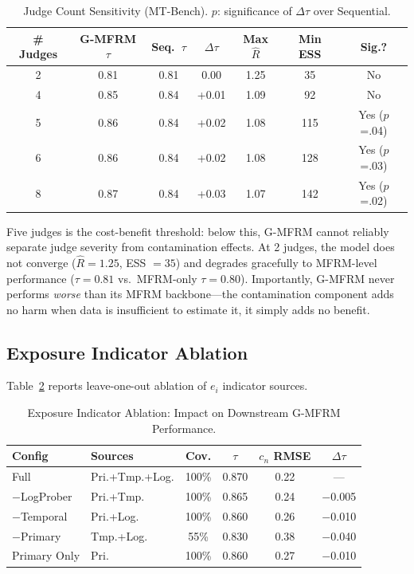 \documentclass[11pt]{article}
\newcommand{\gmfrm}{G-MFRM}
\newcommand{\cn}{c_n}
\newcommand{\ei}{e_i}
\begin{document}
\begin{table}[t]
\centering
\caption{Judge Count Sensitivity (MT-Bench). $p$: significance of $\Delta\tau$ over Sequential.}
\label{tab:judge_sensitivity}
\small
\begin{tabular}{ccccccc}
\toprule
\# Judges & \gmfrm{} $\tau$ & Seq.\ $\tau$ & $\Delta\tau$ & Max $\hat{R}$ & Min ESS & Sig.? \\
\midrule
2 & 0.81 & 0.81 & 0.00 & 1.25 & 35 & No \\
4 & 0.85 & 0.84 & +0.01 & 1.09 & 92 & No \\
5 & 0.86 & 0.84 & +0.02 & 1.08 & 115 & Yes ($p$=.04) \\
6 & 0.86 & 0.84 & +0.02 & 1.08 & 128 & Yes ($p$=.03) \\
8 & 0.87 & 0.84 & +0.03 & 1.07 & 142 & Yes ($p$=.02) \\
\bottomrule
\end{tabular}
\end{table}

Five judges is the cost-benefit threshold: below this, \gmfrm{} cannot reliably separate judge severity from contamination effects.
At 2 judges, the model does not converge ($\hat{R} = 1.25$, ESS $= 35$) and degrades gracefully to MFRM-level performance ($\tau = 0.81$ vs.\ MFRM-only $\tau = 0.80$).
Importantly, \gmfrm{} never performs \textit{worse} than its MFRM backbone---the contamination component adds no harm when data is insufficient to estimate it, it simply adds no benefit.

\subsection{Exposure Indicator Ablation}

Table~\ref{tab:ablation} reports leave-one-out ablation of $\ei$ indicator sources.

\begin{table}[t]
\centering
\caption{Exposure Indicator Ablation: Impact on Downstream \gmfrm{} Performance.}
\label{tab:ablation}
\small
\begin{tabular}{llcccc}
\toprule
Config & Sources & Cov. & $\tau$ & $\cn$ RMSE & $\Delta\tau$ \\
\midrule
Full & Pri.+Tmp.+Log. & 100\% & 0.870 & 0.22 & --- \\
$-$LogProber & Pri.+Tmp. & 100\% & 0.865 & 0.24 & $-$0.005 \\
$-$Temporal & Pri.+Log. & 100\% & 0.860 & 0.26 & $-$0.010 \\
$-$Primary & Tmp.+Log. & 55\% & 0.830 & 0.38 & $-$0.040 \\
Primary Only & Pri. & 100\% & 0.860 & 0.27 & $-$0.010 \\
\bottomrule
\end{tabular}
\end{table}
\end{document}
